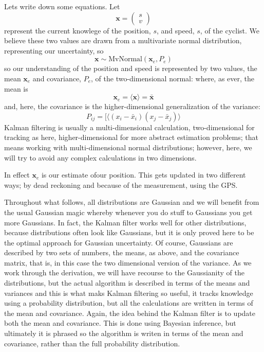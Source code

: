\documentclass[12pt]{article}
\begin{document}
Lets write down some equations. Let
\begin{equation}
\mathbf{x}=\left(\begin{array}{c}s\\v\end{array}\right)
\end{equation}
represent the current knowlege of the position, $s$, and speed, $s$,
of the cyclist. We believe these two values are drawn from a
multivariate normal distribution, representing our uncertainty, so
\begin{equation}
  \mathbf{x}\sim \text{MvNormal}(\mathbf{x}_e,P_e)
\end{equation}
so our understanding of the position and speed is represented by two
values, the mean $\mathbf{x}_e$ and covariance, $P_e$, of the
two-dimensional normal: where, as ever, the mean is
\begin{equation}
  \textbf{x}_e=\langle \textbf{x}\rangle = \bar{\textbf{x}}
\end{equation}
and, here, the covariance is the higher-dimensional
generalization of the variance:
\begin{equation}
P_{ij}=[\langle (x_i-\bar{x}_i)(x_j-\bar{x}_j)\rangle
\end{equation}
Kalman filtering is usually a multi-dimensional calculation,
two-dimensional for tracking as here, higher-dimensional for more
abstract estimation problems; that means working with
multi-dimensional normal distributions; however, here, we will try to
avoid any complex calculations in two dimensions.

In effect $\textbf{x}_e$ is our estimate ofour position. This gets
updated in two different ways; by dead reckoning and because of the
measurement, using the GPS.

Throughout what follows, all distributions are Gaussian and we will
benefit from the usual Gaussian magic whereby whenever you do stuff to
Gaussians you get more Gaussians. In fact, the Kalman filter works
well for other distributions, because distributions often look like
Gaussians, but it is only proved here to be the optimal approach for
Gaussian uncertainty. Of course, Gaussians are described by two sets
of numbers, the means, as above, and the covariance matrix, that is,
in this case the two dimensional version of the variance. As we work
through the derivation, we will have recourse to the Gaussianity of
the distributions, but the actual algorithm is described in terms of
the means and variances and this is what maks Kalman filtering so
useful, it tracks knowledge using a probability distribution, but all
the calculations are written in terms of the mean and
covariance. Again, the idea behind the Kalman filter is to update both
the mean and covariance. This is done using Bayesian inference, but
ultimately it is phrased so the algorithm is writen in terms of the
mean and covariance, rather than the full probability distribution.
\end{document}
